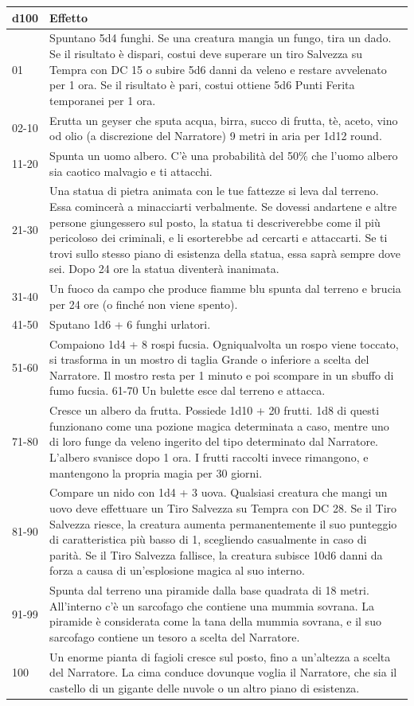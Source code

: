 \begin{tabularx}{0.95\textwidth}{lX}
	\textbf{d100} & \textbf{Effetto}\\
	\hline
	01 &Spuntano 5d4 funghi. Se una creatura mangia un fungo, tira un dado. Se il risultato è dispari, costui deve superare un tiro Salvezza su Tempra con DC 15 o subire 5d6 danni da veleno e restare avvelenato per 1 ora. Se il risultato è pari, costui ottiene 5d6 Punti Ferita temporanei per 1 ora.\\
	02-10 &Erutta un geyser che sputa acqua, birra, succo di frutta, tè, aceto, vino od olio (a discrezione del Narratore) 9 metri in aria per 1d12 round.\\
	11-20 &Spunta un uomo albero. C'è una probabilità del 50\% che l'uomo albero sia caotico malvagio e ti attacchi.\\
	21-30 &Una statua di pietra animata con le tue fattezze si leva dal terreno. Essa comincerà a minacciarti verbalmente. Se dovessi andartene e altre persone giungessero sul posto, la statua ti descriverebbe come il più pericoloso dei criminali, e li esorterebbe ad cercarti e attaccarti. Se ti trovi sullo stesso piano di esistenza della statua, essa saprà sempre dove sei. Dopo 24 ore la statua diventerà inanimata.\\
	31-40 &Un fuoco da campo che produce fiamme blu spunta dal terreno e brucia per 24 ore (o finché non viene spento).\\
	41-50 &Sputano 1d6 + 6 funghi urlatori.\\
	51-60 &Compaiono 1d4 + 8 rospi fucsia. Ogniqualvolta un rospo viene toccato, si trasforma in un mostro di taglia Grande o inferiore a scelta del Narratore. Il mostro resta per 1 minuto e poi scompare in un sbuffo di fumo fucsia. 61-70 Un bulette esce dal terreno e attacca.\\
	71-80 &Cresce un albero da frutta. Possiede 1d10 + 20 frutti. 1d8 di questi funzionano come una pozione magica determinata a caso, mentre uno di loro funge da veleno ingerito del tipo determinato dal Narratore. L'albero svanisce dopo 1 ora. I frutti raccolti invece rimangono, e mantengono la propria magia per 30 giorni. \\
	81-90 &Compare un nido con 1d4 + 3 uova. Qualsiasi creatura che mangi un uovo deve effettuare un Tiro Salvezza su Tempra con DC 28. Se il Tiro Salvezza riesce, la
	creatura aumenta permanentemente il suo punteggio di caratteristica più basso di 1, scegliendo casualmente in caso di parità. Se il Tiro Salvezza fallisce, la creatura subisce 10d6 danni da forza a causa di un'esplosione magica al suo interno.\\
	91-99 &Spunta dal terreno una piramide dalla base quadrata di 18 metri. All'interno c'è un sarcofago che contiene una mummia sovrana. La piramide è considerata come la tana della mummia sovrana, e il suo sarcofago contiene un tesoro a scelta del Narratore.\\
	100 &Un enorme pianta di fagioli cresce sul posto, fino a un'altezza a scelta del Narratore. La cima conduce dovunque voglia il Narratore, che sia il castello di un gigante delle nuvole o un altro piano di esistenza.
\end{tabularx}

